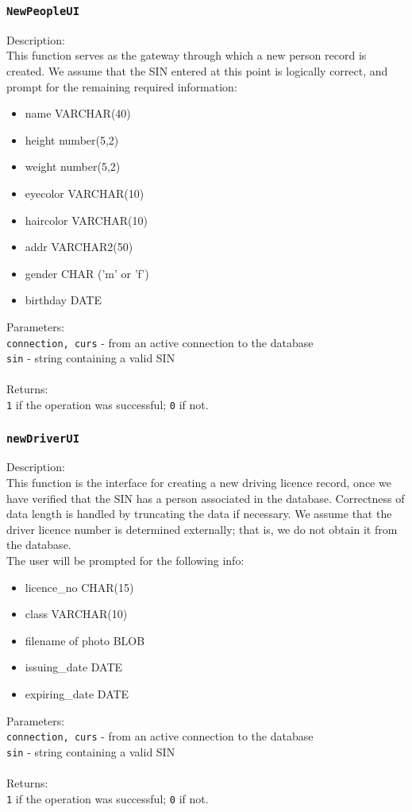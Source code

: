 \documentclass[12pt]{article}
\begin{document}
\subsubsection{\texttt{NewPeopleUI}}
Description:\\
\indent This function serves as the gateway through which a new person record is created.
We assume that the SIN entered at this point is logically correct, and prompt for the remaining required information:
\begin{itemize}
\item name VARCHAR(40)
\item height number(5,2)
\item weight number(5,2)
\item eyecolor VARCHAR(10)
\item haircolor VARCHAR(10)
\item addr VARCHAR2(50)
\item gender CHAR ('m' or 'f')
\item birthday DATE
\end{itemize}
Parameters:\\
\indent\texttt{connection, curs} - from an active connection to the database\\
\indent\texttt{sin} - string containing a valid SIN\\\\
Returns:\\
\indent \texttt{1} if the operation was successful; \texttt{0} if not.

\subsubsection{\texttt{newDriverUI}}
Description:\\
\indent This function is the interface for creating a new driving licence record, once we have verified that the SIN has a person associated in the database. Correctness of data length is handled by truncating the data if necessary. We assume that the driver licence number is determined externally; that is, we do not obtain it from the database.\\
The user will be prompted for the following info:
\begin{itemize}
\item licence\_no CHAR(15)
\item class VARCHAR(10)
\item filename of photo BLOB
\item issuing\_date DATE
\item expiring\_date DATE
\end{itemize}
Parameters:\\
\indent\texttt{connection, curs} - from an active connection to the database\\
\indent\texttt{sin} - string containing a valid SIN\\\\
Returns:\\
\indent \texttt{1} if the operation was successful; \texttt{0} if not.
\end{document}
